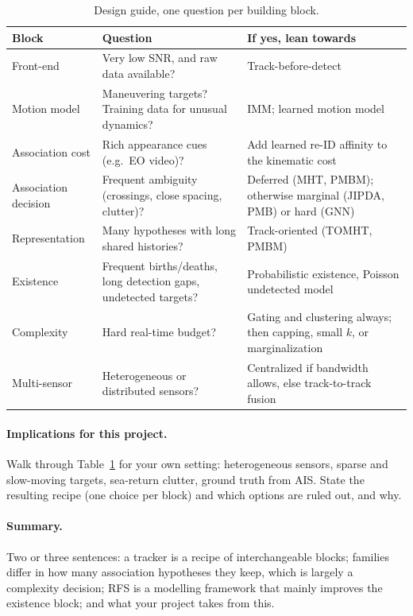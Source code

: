 \begin{table}[htbp]
\centering\small
\caption{Design guide, one question per building block.
  }
\label{tab:selection}
\begin{tabularx}{\textwidth}{>{\raggedright\arraybackslash}p{2.3cm} X X}
\toprule
Block & Question & If yes, lean towards \\
\midrule
Front-end   & Very low SNR, and raw data available? & Track-before-detect \\
Motion model & Maneuvering targets? Training data for unusual dynamics? & IMM; learned motion model \\
Association cost & Rich appearance cues (e.g.\ EO video)? & Add learned re-ID affinity to the kinematic cost \\
Association decision & Frequent ambiguity (crossings, close spacing, clutter)? & Deferred (MHT, PMBM); otherwise marginal (JIPDA, PMB) or hard (GNN) \\
Representation & Many hypotheses with long shared histories? & Track-oriented (TOMHT, PMBM) \\
Existence   & Frequent births/deaths, long detection gaps, undetected targets? & Probabilistic existence, Poisson undetected model \\
Complexity  & Hard real-time budget? & Gating and clustering always; then capping, small $k$, or marginalization \\
Multi-sensor & Heterogeneous or distributed sensors? & Centralized if bandwidth allows, else track-to-track fusion \\
\bottomrule
\end{tabularx}
\end{table}

\paragraph{Implications for this project.}
Walk through Table~\ref{tab:selection} for your own setting: heterogeneous sensors, sparse and slow-moving targets, sea-return clutter, ground truth from AIS. State the resulting recipe (one choice per block) and which options are ruled out, and why.

\paragraph{Summary.}
Two or three sentences: a tracker is a recipe of interchangeable blocks; families differ in how many association hypotheses they keep, which is largely a complexity decision; RFS is a modelling framework that mainly improves the existence block; and what your project takes from this.

